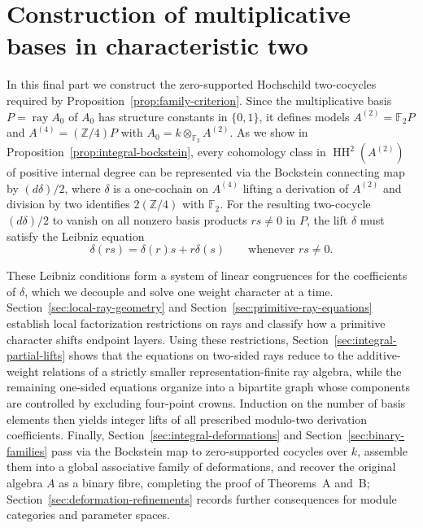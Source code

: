 \documentclass[a4paper,reqno,11pt]{amsart}
\theoremstyle{definition}
\DeclareMathOperator{\HH}{HH}
\newcommand{\ray}{\operatorname{ray}}
\newcommand{\Z}{\mathbb Z}
\newcommand{\F}{\mathbb F}
\begin{document}
\clearpage
\part{Construction of multiplicative bases in characteristic two}
\label{part:characteristic-two}

In this final part we construct the zero-supported Hochschild two-cocycles
required by Proposition~\ref{prop:family-criterion}. Since the multiplicative
basis $P=\ray A_0$ of $A_0$ has structure constants in $\{0,1\}$, it defines
models $A^{(2)}=\F_2P$ and $A^{(4)}=(\Z/4)P$ with
$A_0=k\otimes_{\F_2}A^{(2)}$. As we show in
Proposition~\ref{prop:integral-bockstein}, every cohomology class in
$\HH^2(A^{(2)})$ of positive internal degree can be represented via the
Bockstein connecting map by $(d\delta)/2$, where $\delta$ is a one-cochain
on $A^{(4)}$ lifting a derivation of $A^{(2)}$ and division by two identifies
$2(\Z/4)$ with $\F_2$. For the resulting two-cocycle $(d\delta)/2$ to vanish
on all nonzero basis products $rs\ne0$ in $P$, the lift $\delta$ must satisfy
the Leibniz equation
\[
 \delta(rs)=\delta(r)s+r\delta(s)\qquad\text{whenever }rs\ne0.
\]

These Leibniz conditions form a system of linear congruences for the
coefficients of $\delta$, which we decouple and solve one weight character at
a time. Section~\ref{sec:local-ray-geometry} and
Section~\ref{sec:primitive-ray-equations} establish local factorization
restrictions on rays and classify how a primitive character shifts endpoint
layers. Using these restrictions, Section~\ref{sec:integral-partial-lifts}
shows that the equations on two-sided rays reduce to the additive-weight
relations of a strictly smaller representation-finite ray algebra, while the
remaining one-sided equations organize into a bipartite graph whose
components are controlled by excluding four-point crowns. Induction on the
number of basis elements then yields integer lifts of all prescribed modulo-two
derivation coefficients. Finally, Section~\ref{sec:integral-deformations}
and Section~\ref{sec:binary-families} pass via the Bockstein map to
zero-supported cocycles over $k$, assemble them into a global associative
family of deformations, and recover the original algebra $A$ as a binary
fibre, completing the proof of Theorems~A and~B;
Section~\ref{sec:deformation-refinements} records further consequences for
module categories and parameter spaces.








\end{document}
